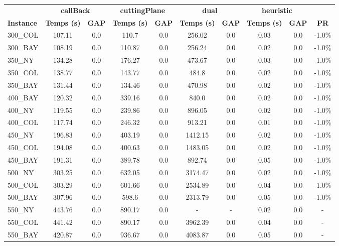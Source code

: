 \documentclass[main.tex]{subfiles}
\begin{document}
\begin{center}
\renewcommand{\arraystretch}{1.4} 
 \begin{tabular}{lccccccccc}
	\hline
 & \multicolumn{2}{c}{\textbf{callBack}} & \multicolumn{2}{c}{\textbf{cuttingPlane}} & \multicolumn{2}{c}{\textbf{dual}} & \multicolumn{2}{c}{\textbf{heuristic}}\\
\textbf{Instance}  & \textbf{Temps (s)} & \textbf{GAP} & \textbf{Temps (s)} & \textbf{GAP} & \textbf{Temps (s)} & \textbf{GAP} & \textbf{Temps (s)} & \textbf{GAP} & \textbf{PR} \\\hline

300\_COL & 107.11 & 0.0 & 110.7 & 0.0 & 256.02 & 0.0 & 0.03 & 0.0 & -1.0\%\\
300\_BAY & 108.19 & 0.0 & 110.87 & 0.0 & 256.24 & 0.0 & 0.02 & 0.0 & -1.0\%\\
350\_NY & 134.28 & 0.0 & 176.27 & 0.0 & 473.67 & 0.0 & 0.03 & 0.0 & -1.0\%\\
350\_COL & 138.77 & 0.0 & 143.77 & 0.0 & 484.8 & 0.0 & 0.02 & 0.0 & -1.0\%\\
350\_BAY & 131.44 & 0.0 & 134.46 & 0.0 & 470.98 & 0.0 & 0.02 & 0.0 & -1.0\%\\
400\_BAY & 120.32 & 0.0 & 339.16 & 0.0 & 840.0 & 0.0 & 0.02 & 0.0 & -1.0\%\\
400\_NY & 119.55 & 0.0 & 239.86 & 0.0 & 896.05 & 0.0 & 0.02 & 0.0 & -1.0\%\\
400\_COL & 117.74 & 0.0 & 246.32 & 0.0 & 913.21 & 0.0 & 0.01 & 0.0 & -1.0\%\\
450\_NY & 196.83 & 0.0 & 403.19 & 0.0 & 1412.15 & 0.0 & 0.02 & 0.0 & -1.0\%\\
450\_COL & 194.08 & 0.0 & 400.63 & 0.0 & 1483.05 & 0.0 & 0.02 & 0.0 & -1.0\%\\
450\_BAY & 191.31 & 0.0 & 389.78 & 0.0 & 892.74 & 0.0 & 0.05 & 0.0 & -1.0\%\\
500\_NY & 303.25 & 0.0 & 632.05 & 0.0 & 3174.47 & 0.0 & 0.02 & 0.0 & -1.0\%\\
500\_COL & 303.29 & 0.0 & 601.66 & 0.0 & 2534.89 & 0.0 & 0.04 & 0.0 & -1.0\%\\
500\_BAY & 307.96 & 0.0 & 598.6 & 0.0 & 2313.79 & 0.0 & 0.05 & 0.0 & -1.0\%\\
550\_NY & 443.76 & 0.0 & 890.17 & 0.0 & - & - 
 & 0.02 & 0.0 & - \\
550\_COL & 441.42 & 0.0 & 890.17 & 0.0 & 3962.39 & 0.0 & 0.04 & 0.0 & - \\
550\_BAY & 420.87 & 0.0 & 936.67 & 0.0 & 4083.87 & 0.0 & 0.05 & 0.0 & - \\

\end{tabular}
\end{center}
\end{document}
